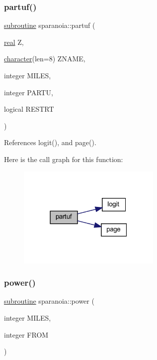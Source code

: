 \mbox{\label{sparanoia_8f90_ab742eeb0cdf95dcdf1340960ce387095}} 
\subsubsection{\texorpdfstring{partuf()}{partuf()}}
{\footnotesize\ttfamily \hyperlink{M__stopwatch_83_8txt_acfbcff50169d691ff02d4a123ed70482}{subroutine} sparanoia\+::partuf (\begin{DoxyParamCaption}\item[{\hyperlink{read__watch_83_8txt_abdb62bde002f38ef75f810d3a905a823}{real}}]{Z,  }\item[{\hyperlink{option__stopwatch_83_8txt_abd4b21fbbd175834027b5224bfe97e66}{character}(len=8)}]{Z\+N\+A\+ME,  }\item[{integer}]{M\+I\+L\+ES,  }\item[{integer}]{P\+A\+R\+TU,  }\item[{logical}]{R\+E\+S\+T\+RT }\end{DoxyParamCaption})}



References logit(), and page().

Here is the call graph for this function\+:
\nopagebreak
\begin{figure}[H]
\begin{center}
\leavevmode
\includegraphics[width=195pt]{sparanoia_8f90_ab742eeb0cdf95dcdf1340960ce387095_cgraph}
\end{center}
\end{figure}
\mbox{\label{sparanoia_8f90_aa0f6d55a5569e0c070c918b0716dc073}} 
\subsubsection{\texorpdfstring{power()}{power()}}
{\footnotesize\ttfamily \hyperlink{M__stopwatch_83_8txt_acfbcff50169d691ff02d4a123ed70482}{subroutine} sparanoia\+::power (\begin{DoxyParamCaption}\item[{integer}]{M\+I\+L\+ES,  }\item[{integer}]{F\+R\+OM }\end{DoxyParamCaption})}



